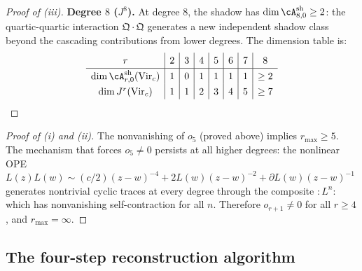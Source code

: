 \begin{proof}[Proof of {\textup{(iii)}}]
\medskip\noindent\textbf{Degree $8$ ($J^8$).}
At degree $8$, the shadow has $\dim \cA^{\mathrm{sh}}_{8,0} \geq 2$: the
quartic-quartic interaction $\mathfrak{Q} \cdot \mathfrak{Q}$ generates a new
independent shadow class beyond the cascading contributions from lower degrees.
The dimension table is:
\[
\renewcommand{\arraystretch}{1.3}
\begin{array}{c|c|c|c|c|c|c|c}
r & 2 & 3 & 4 & 5 & 6 & 7 & 8 \\
\hline
\dim \cA^{\mathrm{sh}}_{r,0}(\mathrm{Vir}_c) & 1 & 0 & 1 & 1 & 1 & 1 & \geq 2 \\
\dim J^r(\mathrm{Vir}_c) & 1 & 1 & 2 & 3 & 4 & 5 & \geq 7
\end{array}
\]
\end{proof}

\begin{proof}[Proof of {\textup{(i)}} and {\textup{(ii)}}]
The nonvanishing of $o_5$ (proved above) implies $r_{\max} \geq 5$. The mechanism
that forces $o_5 \neq 0$ persists at all higher degrees: the nonlinear OPE
$L(z) L(w) \sim (c/2)(z-w)^{-4} + 2L(w)(z-w)^{-2} + \partial L(w)(z-w)^{-1}$
generates nontrivial cyclic traces at every degree through the composite
$:L^n:$ which has nonvanishing self-contraction for all $n$. Therefore
$o_{r+1} \neq 0$ for all $r \geq 4$, and $r_{\max} = \infty$.
\end{proof}

\subsection{The four-step reconstruction algorithm}

